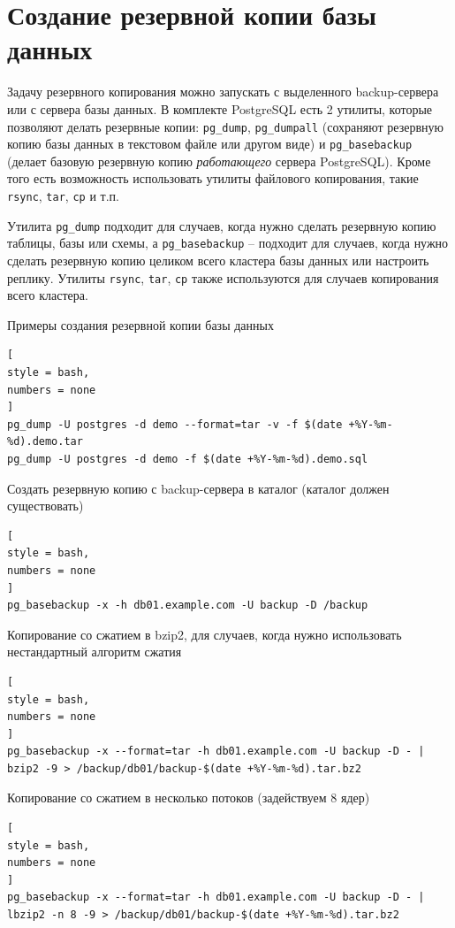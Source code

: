 \documentclass[%
	11pt,
	a4paper,
	utf8,
		]{article}
\begin{document}
\section{Создание резервной копии базы данных}

Задачу резервного копирования можно запускать с выделенного backup-сервера или с сервера базы данных. В комплекте PostgreSQL есть 2 утилиты, которые позволяют делать резервные копии: \texttt{pg\_dump}, \texttt{pg\_dumpall} (сохраняют резервную копию базы данных в текстовом файле или другом виде) и \texttt{pg\_basebackup} (делает базовую резервную копию \emph{работающего} сервера PostgreSQL). Кроме того есть возможность использовать утилиты файлового копирования, такие \texttt{rsync}, \texttt{tar}, \texttt{cp} и т.п.

Утилита \texttt{pg\_dump} подходит для случаев, когда нужно сделать резервную копию таблицы, базы или схемы, а \texttt{pg\_basebackup} -- подходит для случаев, когда нужно сделать резервную копию целиком всего кластера базы данных или настроить реплику. Утилиты \texttt{rsync}, \texttt{tar}, \texttt{cp} также используются для случаев копирования всего кластера.

Примеры создания резервной копии базы данных
\begin{lstlisting}[
style = bash,
numbers = none
]
pg_dump -U postgres -d demo --format=tar -v -f $(date +%Y-%m-%d).demo.tar
pg_dump -U postgres -d demo -f $(date +%Y-%m-%d).demo.sql
\end{lstlisting}

Создать резервную копию с backup-сервера в каталог  (каталог должен существовать)
\begin{lstlisting}[
style = bash,
numbers = none
]
pg_basebackup -x -h db01.example.com -U backup -D /backup

\end{lstlisting}

Копирование со сжатием в bzip2, для случаев, когда нужно использовать нестандартный алгоритм сжатия
\begin{lstlisting}[
style = bash,
numbers = none
]
pg_basebackup -x --format=tar -h db01.example.com -U backup -D - | bzip2 -9 > /backup/db01/backup-$(date +%Y-%m-%d).tar.bz2
\end{lstlisting}

Копирование со сжатием в несколько потоков (задействуем 8 ядер)
\begin{lstlisting}[
style = bash,
numbers = none
]
pg_basebackup -x --format=tar -h db01.example.com -U backup -D - | lbzip2 -n 8 -9 > /backup/db01/backup-$(date +%Y-%m-%d).tar.bz2
\end{lstlisting}
\end{document}
